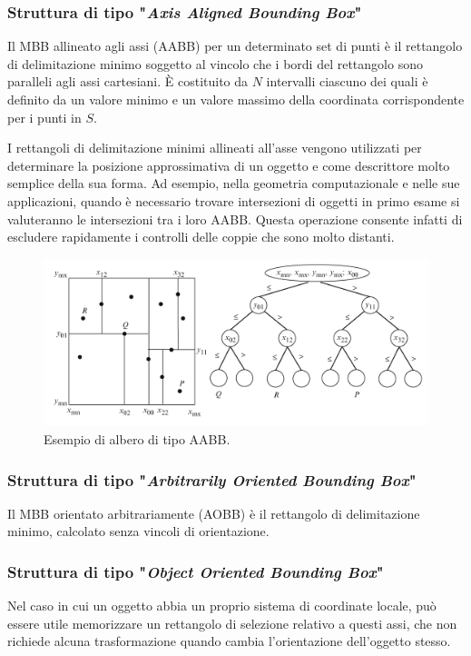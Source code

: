 \subsubsection{Struttura di tipo "\textit{Axis Aligned Bounding Box}"}
Il \ac{MBB} allineato agli assi (\ac{AABB}) per un determinato set di punti è il rettangolo di delimitazione minimo soggetto al vincolo che i bordi del rettangolo sono paralleli agli assi cartesiani. È costituito da $N$ intervalli ciascuno dei quali è definito da un valore minimo e un valore massimo della coordinata corrispondente per i punti in $S$.

I rettangoli di delimitazione minimi allineati all'asse vengono utilizzati per determinare la posizione approssimativa di un oggetto e come descrittore molto semplice della sua forma. Ad esempio, nella geometria computazionale e nelle sue applicazioni, quando è necessario trovare intersezioni  di oggetti in primo esame si valuteranno le intersezioni tra i loro \ac{AABB}. Questa operazione consente infatti di escludere rapidamente i controlli delle coppie che sono molto distanti.

\begin{figure}[h]
	\centering
	\includegraphics[width=\linewidth]{Figures/AABB}
	\caption{Esempio di albero di tipo AABB.}
	\label{AABB}
\end{figure}
%
\subsubsection{Struttura di tipo "\textit{Arbitrarily Oriented Bounding Box}"}
Il \ac{MBB} orientato arbitrariamente (\ac{AOBB}) è il rettangolo di delimitazione minimo, calcolato senza vincoli di orientazione.
%
\subsubsection{Struttura di tipo "\textit{Object Oriented Bounding Box}"}
Nel caso in cui un oggetto abbia un proprio sistema di coordinate locale, può essere utile memorizzare un rettangolo di selezione relativo a questi assi, che non richiede alcuna trasformazione quando cambia l'orientazione dell'oggetto stesso.

